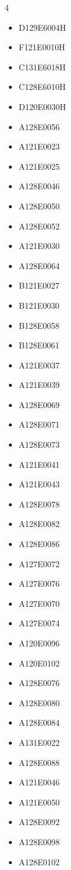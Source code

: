 \documentclass[a4paper,11pt]{article}
\renewcommand{\_}{\oldunderscore\allowbreak}
\begin{document}
\begin{multicols}{4}
\begin{itemize}
	\item D129E6004H
	\item F121E0010H
	\item C131E6018H
	\item C128E6010H
	\item D120E0030H
	\item A128E0056
	\item A121E0023
	\item A121E0025
	\item A128E0046
	\item A128E0050
	\item A128E0052
	\item A121E0030
	\item A128E0064
	\item B121E0027
	\item B121E0030
	\item B128E0058
	\item B128E0061
	\item A121E0037
	\item A121E0039
	\item A128E0069
	\item A128E0071
	\item A128E0073
	\item A121E0041
	\item A121E0043
	\item A128E0078
	\item A128E0082
	\item A128E0086
	\item A127E0072
	\item A127E0076
	\item A127E0070
	\item A127E0074
	\item A120E0096
	\item A120E0102
	\item A128E0076
	\item A128E0080
	\item A128E0084
	\item A131E0022
	\item A128E0088
	\item A121E0046
	\item A121E0050
	\item A128E0092
	\item A128E0098
	\item A128E0102
\end{itemize}
\end{multicols}
\end{document}

